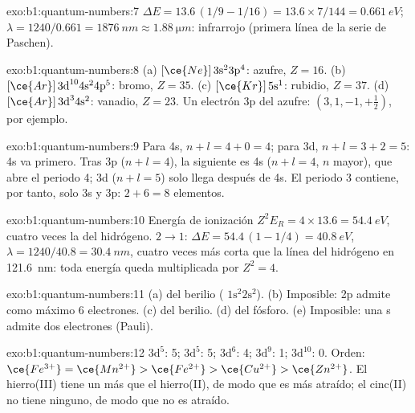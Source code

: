 \begin{solution}{exo:b1:quantum-numbers:7}
$\Delta E = 13.6\,(1/9 - 1/16) = 13.6 \times 7/144 = \qty{0.661}{eV}$;
$\lambda = 1240/0.661 = \qty{1876}{nm} \approx \qty{1.88}{\micro m}$:
infrarrojo (primera línea de la serie de Paschen).
\end{solution}

\begin{solution}{exo:b1:quantum-numbers:8}
(a) $[\ce{Ne}]\,3\text{s}^2 3\text{p}^4$: azufre, $Z = 16$.
(b) $[\ce{Ar}]\,3\text{d}^{10} 4\text{s}^2 4\text{p}^5$: bromo, $Z = 35$.
(c) $[\ce{Kr}]\,5\text{s}^1$: rubidio, $Z = 37$.
(d) $[\ce{Ar}]\,3\text{d}^3 4\text{s}^2$: vanadio, $Z = 23$.
Un electrón 3p del azufre: $(3, 1, -1, +\tfrac12)$, por ejemplo.
\end{solution}

\begin{solution}{exo:b1:quantum-numbers:9}
Para 4s, $n + l = 4 + 0 = 4$; para 3d, $n + l = 3 + 2 = 5$: 4s va
primero. Tras 3p ($n + l = 4$), la  siguiente es 4s ($n + l = 4$,
$n$ mayor), que abre el periodo 4; 3d ($n + l = 5$) solo llega después
de 4s. El periodo 3 contiene, por tanto, solo 3s y 3p: $2 + 6 = 8$
elementos.
\end{solution}

\begin{solution}{exo:b1:quantum-numbers:10}
Energía de ionización $Z^2E_R = 4 \times 13.6 = \qty{54.4}{eV}$, cuatro
veces la del hidrógeno. $2 \to 1$: $\Delta E = 54.4\,(1 - 1/4) = \qty{40.8}{eV}$,
$\lambda = 1240/40.8 = \qty{30.4}{nm}$, cuatro veces más corta que la
línea del hidrógeno en \qty{121.6}{nm}: toda energía queda multiplicada
por $Z^2 = 4$.
\end{solution}

\begin{solution}{exo:b1:quantum-numbers:11}
(a)  del berilio ( $1\text{s}^2 2\text{s}^2$).
(b) Imposible: 2p admite como máximo 6 electrones. (c)  del
berilio. (d)  del fósforo. (e) Imposible: una  s
admite dos electrones (Pauli).
\end{solution}

\begin{solution}{exo:b1:quantum-numbers:12}
 $3\text{d}^5$: 5;  $3\text{d}^5$: 5; 
$3\text{d}^6$: 4;  $3\text{d}^9$: 1; 
$3\text{d}^{10}$: 0. Orden: $\ce{Fe^{3+}} = \ce{Mn^{2+}} > \ce{Fe^{2+}}
> \ce{Cu^{2+}} > \ce{Zn^{2+}}$. El hierro(III) tiene un  más que el hierro(II), de modo que es más atraído; el
cinc(II) no tiene ninguno, de modo que no es atraído.
\end{solution}

